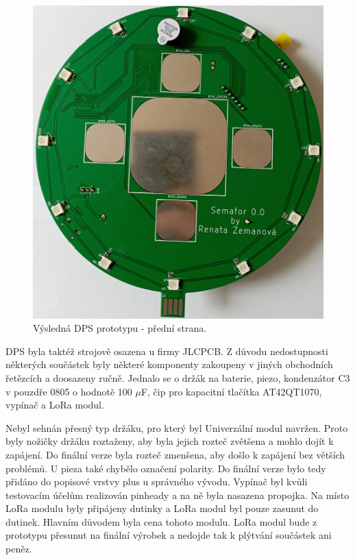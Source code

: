 \begin{figure}[!h]
  \begin{center}
    \includegraphics[scale=0.13]{obrazky/DPS_prototyp_top.jpg}
  \end{center}
  \caption[Výsledná DPS prototypu - přední strana]{Výsledná DPS prototypu - přední strana.}
\end{figure}

DPS byla taktéž strojově osazena u firmy JLCPCB. Z důvodu nedostupnosti některých součástek byly některé komponenty zakoupeny v jiných obchodních řetězcích a doosazeny ručně. 
Jednalo se o držák na baterie, piezo, kondenzátor C3 v pouzdře 0805 o hodnotě 100 $\mu$F, čip pro kapacitní tlačítka AT42QT1070, vypínač a LoRa modul. 

Nebyl sehnán přesný typ držáku, pro který byl Univerzální modul navržen. Proto byly nožičky držáku roztaženy, aby byla jejich rozteč zvětšena a mohlo dojít k zapájení. Do finální 
verze byla rozteč zmenšena, aby došlo k zapájení bez větších problémů. U pieza také chybělo 
označení polarity. Do finální verze bylo tedy přidáno do popisové vrstvy plus u správného vývodu. Vypínač byl kvůli testovacím účelům realizován pinheady a na ně byla nasazena 
propojka. Na místo LoRa modulu byly připájeny dutinky a LoRa modul byl pouze zasunut do dutinek. Hlavním důvodem byla cena tohoto modulu. LoRa modul bude z prototypu přesunut 
na finální výrobek a nedojde tak k plýtvání součástek ani peněz.

